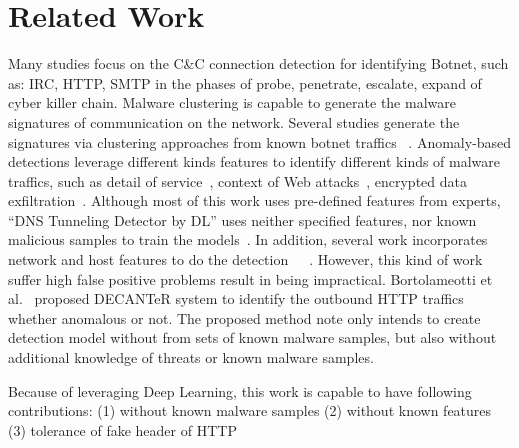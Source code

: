 \section{Related Work}

Many studies focus on the C\&C connection detection for identifying Botnet, such as: IRC, HTTP, SMTP in the phases of probe, penetrate, escalate, expand of cyber killer chain.  Malware clustering is capable to generate the malware signatures of communication on the network.   Several studies generate the signatures via clustering approaches from known botnet traffics ~\cite{p:zarras14}.   Anomaly-based detections leverage different kinds features to identify different kinds of malware traffics, such as detail of service~\cite{p:feinstein03}, context of Web attacks~\cite{p:krugel03},  encrypted data exfiltration~\cite{p:he14}.  Although most of this work uses pre-defined features from experts,  “DNS Tunneling Detector by DL” uses neither specified features, nor  known malicious samples to train the models~\cite{j:zhang16}.  In addition, several work incorporates network and host features to do the detection~\cite{p:schwenk11}~\cite{p:Borders04}~\cite{p:schwenk11}.  However, this kind of work suffer high false positive problems result in being impractical.  Bortolameotti et al.~\cite{p:Bortolameotti17} proposed DECANTeR system to identify the outbound HTTP traffics whether anomalous or not.   The proposed method note only intends to create detection model without from sets of known malware samples, but also without additional knowledge of threats or known malware samples.

Because of leveraging Deep Learning, this work is capable to have  following contributions:
(1) without known malware samples
(2) without known features
(3) tolerance of fake header of HTTP